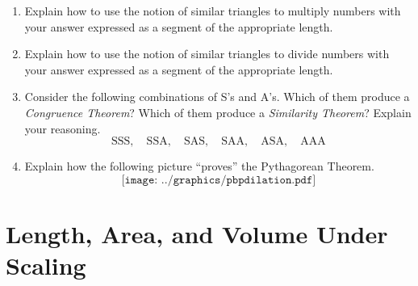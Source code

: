\begin{problems}
\begin{enumerate}
\item Explain how to use the notion of similar triangles to multiply
  numbers with your answer expressed as a segment of the appropriate
  length.

\item Explain how to use the notion of similar triangles to divide
  numbers with your answer expressed as a segment of the appropriate
  length.


\item Consider the following combinations of S's and A's. Which of
  them produce a \textit{Congruence Theorem}? Which of them produce a
  \textit{Similarity Theorem}? Explain your reasoning.
\[
\text{SSS},\quad \text{SSA},\quad \text{SAS},\quad 
\text{SAA},\quad \text{ASA},\quad \text{AAA} 
\]


\item Explain how the following picture ``proves'' the Pythagorean Theorem.
\[
\texttt{[image: ../graphics/pbpdilation.pdf]}
\]



\end{enumerate}
\end{problems}


\section{Length, Area, and Volume Under Scaling}

